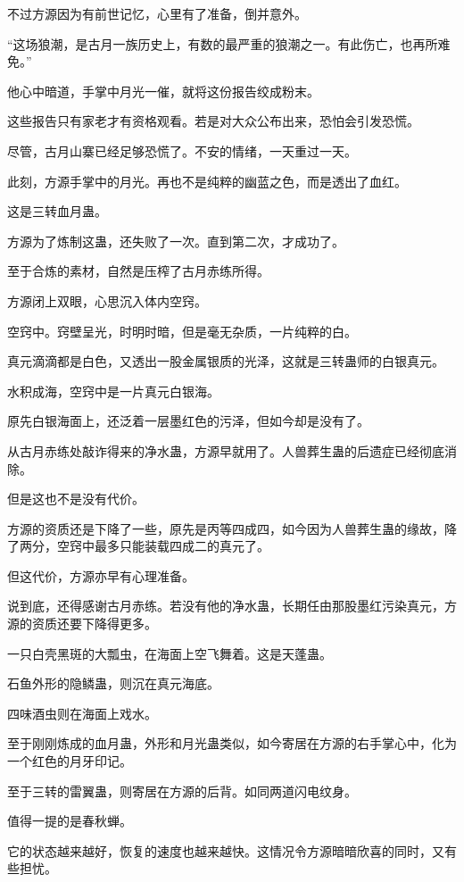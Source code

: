 \begin{this_body}
不过方源因为有前世记忆，心里有了准备，倒并意外。

“这场狼潮，是古月一族历史上，有数的最严重的狼潮之一。有此伤亡，也再所难免。”

他心中暗道，手掌中月光一催，就将这份报告绞成粉末。

这些报告只有家老才有资格观看。若是对大众公布出来，恐怕会引发恐慌。

尽管，古月山寨已经足够恐慌了。不安的情绪，一天重过一天。

此刻，方源手掌中的月光。再也不是纯粹的幽蓝之色，而是透出了血红。

这是三转血月蛊。

方源为了炼制这蛊，还失败了一次。直到第二次，才成功了。

至于合炼的素材，自然是压榨了古月赤练所得。

方源闭上双眼，心思沉入体内空窍。

空窍中。窍壁呈光，时明时暗，但是毫无杂质，一片纯粹的白。

真元滴滴都是白色，又透出一股金属银质的光泽，这就是三转蛊师的白银真元。

水积成海，空窍中是一片真元白银海。

原先白银海面上，还泛着一层墨红色的污泽，但如今却是没有了。

从古月赤练处敲诈得来的净水蛊，方源早就用了。人兽葬生蛊的后遗症已经彻底消除。

但是这也不是没有代价。

方源的资质还是下降了一些，原先是丙等四成四，如今因为人兽葬生蛊的缘故，降了两分，空窍中最多只能装载四成二的真元了。

但这代价，方源亦早有心理准备。

说到底，还得感谢古月赤练。若没有他的净水蛊，长期任由那股墨红污染真元，方源的资质还要下降得更多。

一只白壳黑斑的大瓢虫，在海面上空飞舞着。这是天蓬蛊。

石鱼外形的隐鳞蛊，则沉在真元海底。

四味酒虫则在海面上戏水。

至于刚刚炼成的血月蛊，外形和月光蛊类似，如今寄居在方源的右手掌心中，化为一个红色的月牙印记。

至于三转的雷翼蛊，则寄居在方源的后背。如同两道闪电纹身。

值得一提的是春秋蝉。

它的状态越来越好，恢复的速度也越来越快。这情况令方源暗暗欣喜的同时，又有些担忧。


\end{this_body}
